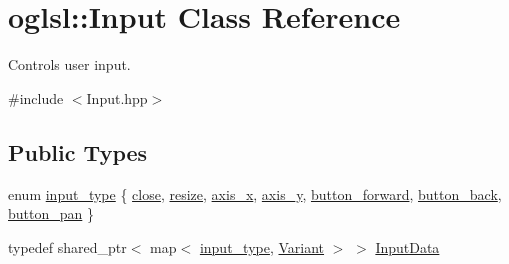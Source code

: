 \hypertarget{classoglsl_1_1_input}{}\section{oglsl\+:\+:Input Class Reference}
\label{classoglsl_1_1_input}


Controls user input.  




{\ttfamily \#include $<$Input.\+hpp$>$}

\subsection*{Public Types}
\begin{DoxyCompactItemize}
\item 
enum \mbox{\hyperlink{classoglsl_1_1_input_a15a9c7fee0099a0ef55912433a402752}{input\+\_\+type}} \{ \newline
\mbox{\hyperlink{classoglsl_1_1_input_a15a9c7fee0099a0ef55912433a402752a7ecd04666075beef013d78b2515271d5}{close}}, 
\mbox{\hyperlink{classoglsl_1_1_input_a15a9c7fee0099a0ef55912433a402752a737ebbec03a63d58ef604b4f031ee28b}{resize}}, 
\mbox{\hyperlink{classoglsl_1_1_input_a15a9c7fee0099a0ef55912433a402752a80b5b567edac8fa86ea39cbdac1497ff}{axis\+\_\+x}}, 
\mbox{\hyperlink{classoglsl_1_1_input_a15a9c7fee0099a0ef55912433a402752aa36ca5fc001ca721f3be7ca05180f481}{axis\+\_\+y}}, 
\newline
\mbox{\hyperlink{classoglsl_1_1_input_a15a9c7fee0099a0ef55912433a402752a9a24dd9fe85f1a338adcacf906ae3eb2}{button\+\_\+forward}}, 
\mbox{\hyperlink{classoglsl_1_1_input_a15a9c7fee0099a0ef55912433a402752aab326e60bc33955a42eba8a890754533}{button\+\_\+back}}, 
\mbox{\hyperlink{classoglsl_1_1_input_a15a9c7fee0099a0ef55912433a402752a9ef3cabe4ce6e53d2d3c604661b26aa2}{button\+\_\+pan}}
 \}
\item 
typedef shared\+\_\+ptr$<$ map$<$ \mbox{\hyperlink{classoglsl_1_1_input_a15a9c7fee0099a0ef55912433a402752}{input\+\_\+type}}, \mbox{\hyperlink{classoglsl_1_1_variant}{Variant}} $>$ $>$ \mbox{\hyperlink{classoglsl_1_1_input_a3b21d7328538e661f366af5d6059c197}{Input\+Data}}
\end{DoxyCompactItemize}
